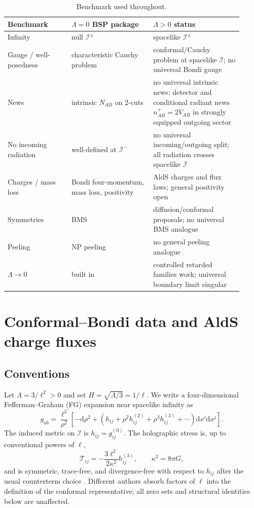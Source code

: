 \documentclass[11pt,a4paper]{article}
\newcommand{\scri}{\mathscr{I}}
\newcommand{\cT}{\mathcal{T}}
\newcommand{\diff}{\mathrm{d}}
\begin{document}
\begin{table}[h]
\centering
\begin{tabular}{p{0.25\linewidth}p{0.32\linewidth}p{0.35\linewidth}}
\hline
Benchmark & \(\Lambda=0\) BSP package & \(\Lambda>0\) status\\
\hline
Infinity & null \(\scri^\pm\) & spacelike \(\scri^\pm\)\\
Gauge / well-posedness & characteristic Cauchy problem & conformal/Cauchy problem at spacelike \(\scri\); no universal Bondi gauge\\
News & intrinsic \(N_{AB}\) on 2-cuts & no universal intrinsic news; detector and conditional radiant news \(n^+_{AB}=2V_{AB}\) in strongly equipped outgoing sector\\
No incoming radiation & well-defined at \(\scri^-\) & no universal incoming/outgoing split; all radiation crosses spacelike \(\scri\)\\
Charges / mass loss & Bondi four-momentum, mass loss, positivity & AldS charges and flux laws; general positivity open\\
Symmetries & BMS & diffusion/conformal proposals; no universal BMS analogue\\
Peeling & NP peeling & no general peeling analogue\\
\(\Lambda\to0\) & built in & controlled retarded families work; universal boundary limit singular\\
\hline
\end{tabular}
\caption{Benchmark used throughout.}
\end{table}

\section{Conformal--Bondi data and AldS charge fluxes}

\subsection{Conventions}

Let \(\Lambda=3/\ell^2>0\) and set \(H=\sqrt{\Lambda/3}=1/\ell\).  We write a four-dimensional Fefferman--Graham (FG) expansion near spacelike infinity as
\begin{equation}
  g_{ab}
  =
  \frac{\ell^2}{\rho^2}
  \left[
    -\diff \rho^2
    +
    \left(
      h_{ij}+\rho^2 h^{(2)}_{ij}+\rho^3 h^{(3)}_{ij}+\cdots
    \right)\diff x^i \diff x^j
  \right].
\end{equation}
The induced metric on \(\scri\) is \(h_{ij}=g^{(0)}_{ij}\).  The holographic stress is, up to conventional powers of \(\ell\),
\begin{equation}
  \cT_{ij}
  =
  -\frac{3\ell^2}{2\kappa^2}h^{(3)}_{ij},
  \qquad \kappa^2=8\pi G,
\end{equation}
and is symmetric, trace-free, and divergence-free with respect to \(h_{ij}\) after the usual counterterm choice \cite{poole2025charges}.  Different authors absorb factors of \(\ell\) into the definition of the conformal representative; all zero sets and structural identities below are unaffected.
\end{document}
